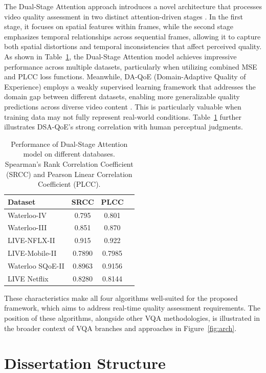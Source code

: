 The Dual-Stage Attention approach introduces a novel architecture that processes video quality assessment in two distinct attention-driven stages \cite{jia2024continuous}. In the first stage, it focuses on spatial features within frames, while the second stage emphasizes temporal relationships across sequential frames, allowing it to capture both spatial distortions and temporal inconsistencies that affect perceived quality. As shown in Table~\ref{tab:dsa_performance}, the Dual-Stage Attention model achieves impressive performance across multiple datasets, particularly when utilizing combined MSE and PLCC loss functions. Meanwhile, DA-QoE (Domain-Adaptive Quality of Experience) employs a weakly supervised learning framework that addresses the domain gap between different datasets, enabling more generalizable quality predictions across diverse video content \cite{li2022weakly}. This is particularly valuable when training data may not fully represent real-world conditions. Table~\ref{tab:dsa_performance} further illustrates DSA-QoE's strong correlation with human perceptual judgments.

\begin{table}[ht]
\centering
\caption{Performance of Dual-Stage Attention model on different databases. Spearman's Rank Correlation Coefficient (SRCC) and Pearson Linear Correlation Coefficient (PLCC).}
\label{tab:dsa_performance}
\begin{tabular}{lccc}
\hline
\textbf{Dataset} & \textbf{SRCC} & \textbf{PLCC} \\
\hline
Waterloo-IV & 0.795 & 0.801 \\
Waterloo-III & 0.851 & 0.870 \\
LIVE-NFLX-II  & 0.915 & 0.922 \\
LIVE-Mobile-II & 0.7890 & 0.7985 \\
Waterloo SQoE-II & 0.8963 & 0.9156 \\
LIVE Netflix  & 0.8280 & 0.8144 \\
\hline
\end{tabular}
\end{table}

These characteristics make all four algorithms well-suited for the proposed framework, which aims to address real-time quality assessment requirements. The position of these algorithms, alongside other VQA methodologies, is illustrated in the broader context of VQA branches and approaches in Figure~\ref{fig:arch}.

\section{Dissertation Structure} \label{sec:struct}

